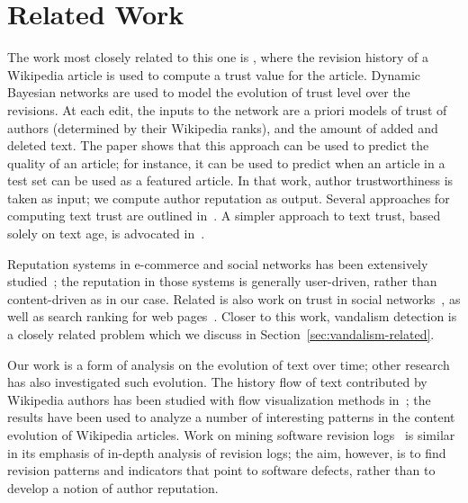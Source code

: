 \section{Related Work}

The work most closely related to this one is \cite{Zeng2006}, where the
revision history of a Wikipedia article is used to compute a trust
value for the article.
Dynamic Bayesian networks are used to model the
evolution of trust level over the revisions. 
At each edit, the inputs to the network are a priori models of
trust of authors (determined by their Wikipedia ranks), 
and the amount of added and deleted text. 
The paper shows that this approach can be used to predict the quality
of an article; for instance, it can be used to predict when an article
in a test set can be used as a featured article.  
In that work, author trustworthiness is
taken as input; we compute author reputation as output. 
Several approaches for computing text trust are outlined
in~\cite{WikiMTWtrust06}. 
A simpler approach to text trust, based solely on text age, is
advocated in~\cite{Cross2006}. 

Reputation systems in e-commerce and social networks has been extensively
studied~\cite{Resnick2000,Dellarocas2003,Kamvar2003,Farmer2010};
the reputation in those systems is generally user-driven, rather than
content-driven as in our case. 
Related is also work on trust in social networks~\cite{Guha2004,Golbeck2005},
as well as search ranking for web pages~\cite{Kleinberg1999,Page1999}.
Closer to this work, vandalism detection is a closely related problem
which we discuss in Section~\ref{sec:vandalism-related}.

Our work is a form of analysis on the evolution of text over time;
other research has also investigated such evolution.
The history flow of text contributed by Wikipedia authors has
been studied with flow visualization methods in~\cite{Viegas2004}; 
the results have been used to analyze a number of interesting patterns
in the content evolution of Wikipedia articles. 
Work on mining software revision logs~\cite{Livshits2005}
is similar in its emphasis of in-depth analysis of revision logs; the
aim, however, is to find revision patterns and indicators that point
to software defects, rather than to develop a notion of author
reputation. 

